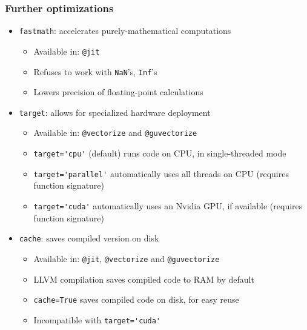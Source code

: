 \documentclass[10pt, aspectratio=1610]{beamer}
\begin{document}
\begin{frame}
  \frametitle{Further optimizations}

  \begin{itemize}
    \item \texttt{fastmath}: accelerates purely-mathematical computations
      \begin{itemize}
        \item Available in: \lstinline{@jit}
        \item Refuses to work with \texttt{NaN}'s, \texttt{Inf}'s
        \item Lowers precision of floating-point calculations
      \end{itemize}
    \vfill
    \item \texttt{target}: allows for specialized hardware deployment
      \begin{itemize}
        \item Available in: \lstinline{@vectorize} and \lstinline{@guvectorize}
        \item \lstinline{target='cpu'} (default) runs code on CPU, in single-threaded mode
        \item \lstinline{target='parallel'} automatically uses all threads on CPU (requires function signature)
        \item \lstinline{target='cuda'} automatically uses an Nvidia GPU, if available (requires function signature)
      \end{itemize}
    \vfill
    \item \texttt{cache}: saves compiled version on disk
      \begin{itemize}
        \item Available in: \lstinline{@jit}, \lstinline{@vectorize} and \lstinline{@guvectorize}
        \item LLVM compilation saves compiled code to RAM by default
        \item \lstinline{cache=True} saves compiled code on disk, for easy reuse
        \item Incompatible with \lstinline{target='cuda'}
      \end{itemize}
  \end{itemize}

\end{frame}
\end{document}
